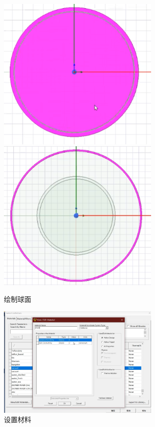 \documentclass{article}
\begin{document}
          \begin{figure}[H]
            \centering
            \includegraphics[width=8cm]{img/14.png}
            \includegraphics[width=8cm]{img/15.png}

          \caption[]{绘制球面}  
          
          \end{figure}
          \begin{figure}[H]
            \centering
            \includegraphics[width=8cm]{img/16.png}
          \caption[]{设置材料}  
          
          \end{figure}
\end{document}
